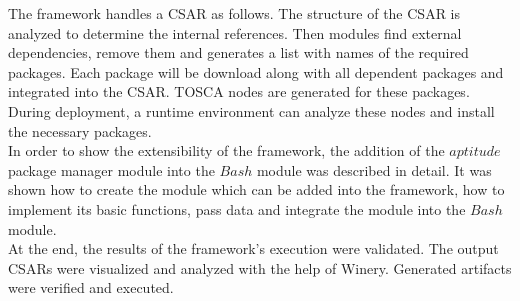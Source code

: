 The framework handles a CSAR as follows.
The structure of the CSAR is analyzed to determine the internal references.
Then modules find external dependencies, remove them and generates a list with names of the required packages.
Each package will be download along with all dependent packages and integrated into the CSAR. 
TOSCA nodes are generated for these packages.
During deployment, a runtime environment can analyze these nodes and install the necessary packages.\\
In order to show the extensibility of the framework, the addition of the $aptitude$ package manager module into the $Bash$ module was described in detail.
It  was shown how to create the module which can be added into the framework, how to implement its basic functions, pass data and integrate the module into the $Bash$ module. \\
At the end, the results of the framework's execution were validated.
The output CSARs were visualized and analyzed with the help of Winery.
Generated artifacts were verified and executed.
